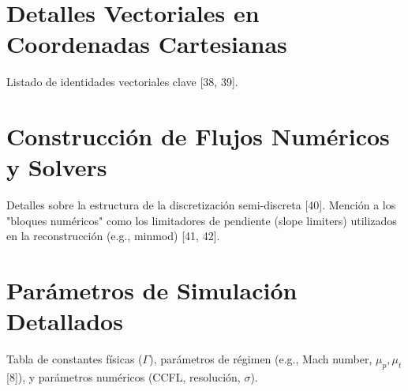 \section{Detalles Vectoriales en Coordenadas Cartesianas}
    Listado de identidades vectoriales clave [38, 39].

\section{Construcción de Flujos Numéricos y Solvers}
    Detalles sobre la estructura de la discretización semi-discreta [40]. Mención a los "bloques numéricos" como los limitadores de pendiente (slope limiters) utilizados en la reconstrucción (e.g., minmod) [41, 42].

\section{Parámetros de Simulación Detallados}
    Tabla de constantes físicas ($\Gamma$), parámetros de régimen (e.g., Mach number, $\mu_p, \mu_t$ [8]), y parámetros numéricos (CCFL, resolución, $\sigma$).


